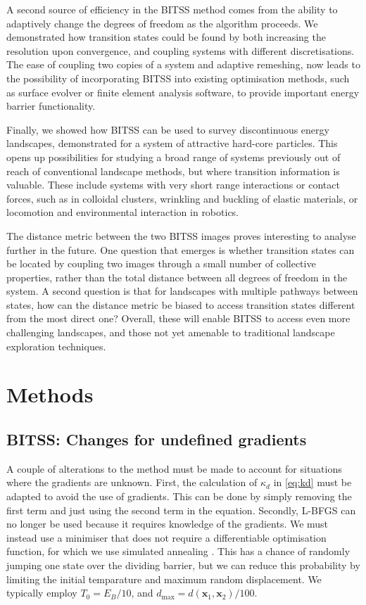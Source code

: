 \documentclass[twocolumn,10pt]{revtex4}
\begin{document}
A second source of efficiency in the BITSS method comes from the ability to adaptively change the degrees of freedom as the algorithm proceeds.
We demonstrated how transition states could be found by both increasing the resolution upon convergence, and coupling systems with different discretisations.
The ease of coupling two copies of a system and adaptive remeshing, now leads to the possibility of incorporating BITSS into existing optimisation methods, such as surface evolver or finite element analysis software, to provide important energy barrier functionality. 

Finally, we showed how BITSS can be used to survey discontinuous energy landscapes, demonstrated for a system of attractive hard-core particles.
This opens up possibilities for studying a broad range of systems previously out of reach of conventional landscape methods, but where transition information is valuable.
These include systems with very short range interactions or contact forces, such as in colloidal clusters, wrinkling and buckling of elastic materials, or locomotion and environmental interaction in robotics.

The distance metric between the two BITSS images proves interesting to analyse further in the future.
One question that emerges is whether transition states can be located by coupling two images through a small number of collective properties, rather than the total distance between all degrees of freedom in the system.
A second question is that for landscapes with multiple pathways between states, how can the distance metric be biased to access transition states different from the most direct one? Overall, these will enable BITSS to access even more challenging landscapes, and those not yet amenable to traditional landscape exploration techniques.


\section{Methods}

\subsection{BITSS: Changes for undefined gradients}
A couple of alterations to the method must be made to account for situations where the gradients are unknown.
First, the calculation of $\kappa_d$ in \cref{eq:kd} must be adapted to avoid the use of gradients.
This can be done by simply removing the first term and just using the second term in the equation.
Secondly, L-BFGS can no longer be used because it requires knowledge of the gradients.
We must instead use a minimiser that does not require a differentiable optimisation function, for which we use simulated annealing \cite{Kirkpatrick1983}.
This has a chance of randomly jumping one state over the dividing barrier, but we can reduce this probability by limiting the initial temparature and maximum random displacement.
We typically employ $T_0 = E_B / 10$, and $d_\text{max} = d(\bm{x}_1, \bm{x}_2) / 100$.
\end{document}
